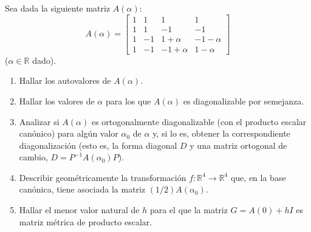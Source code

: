\begin{enunciado}
 Sea dada la siguiente matriz $A(\alpha)$:
 \begin{equation*}
  A(\alpha) = 
  \begin{bmatrix}
   1 &  1 &  1 &  1 \\
   1 &  1 & -1 & -1 \\
   1 & -1 &  1+\alpha & -1-\alpha \\
   1 & -1 & -1+\alpha &  1-\alpha
  \end{bmatrix}
 \end{equation*}
 ($\alpha \in \mathbb{R}$ dado).
 \begin{enumerate}[$a$)]
  \item Hallar los autovalores de $A(\alpha)$.
  
  \item Hallar los valores de $\alpha$ para los que $A(\alpha)$ es diagonalizable por semejanza.
  
  \item Analizar si $A(\alpha)$ es ortogonalmente diagonalizable (con el producto escalar can\'onico) para alg\'un valor $\alpha_0$ de $\alpha$ y, si lo es, obtener la correspondiente diagonalizaci\'on (esto es, la forma diagonal $D$ y una matriz ortogonal de cambio, $D=P^{-1}A(\alpha_0)P$).
  
  \item Describir geom\'etricamente la transformaci\'on $f:\mathbb{R}^4 \to \mathbb{R}^4$ que, en la base can\'onica, tiene asociada la matriz $(1/2)A(\alpha_0)$.
  
  \item Hallar el menor valor natural de $h$ para el que la matriz $G = A(0) + hI$ es matriz m\'etrica de producto escalar.
 \end{enumerate}
\end{enunciado}
 

